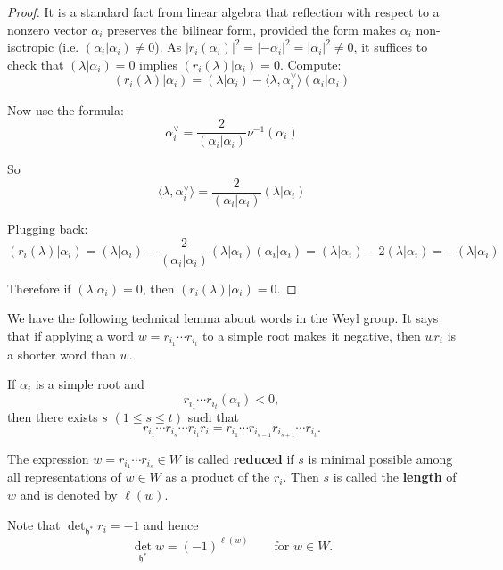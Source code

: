 \documentclass[12pt]{article}
\begin{document}
\begin{proof}
    It is a standard fact from linear algebra that reflection with respect to a nonzero vector $\alpha_i$ preserves the bilinear form, provided the form makes $\alpha_i$ non-isotropic (i.e. $(\alpha_i|\alpha_i)\neq 0$). As $|r_i(\alpha_i)|^2 = |-\alpha_i|^2 = |\alpha_i|^2 \neq 0$, it suffices to check that $(\lambda|\alpha_i) = 0$ implies 
$(r_i(\lambda)|\alpha_i) = 0$. Compute:
\[
(r_i(\lambda)|\alpha_i) = (\lambda|\alpha_i) - \langle \lambda, \alpha_i^\vee \rangle (\alpha_i|\alpha_i)
\]

Now use the formula:
\[
\alpha_i^\vee = \frac{2}{(\alpha_i|\alpha_i)}\nu^{-1}(\alpha_i)
\]

So
\[
\langle \lambda, \alpha_i^\vee \rangle = \frac{2}{(\alpha_i|\alpha_i)} (\lambda|\alpha_i)
\]

Plugging back:
\[
(r_i(\lambda)|\alpha_i)
= (\lambda|\alpha_i) - \frac{2}{(\alpha_i|\alpha_i)} (\lambda|\alpha_i)(\alpha_i|\alpha_i)
= (\lambda|\alpha_i) - 2(\lambda|\alpha_i)
= -(\lambda|\alpha_i)
\]

Therefore if $(\lambda|\alpha_i) = 0$, then $(r_i(\lambda)|\alpha_i)=0$. 
\end{proof}



We have the following technical lemma about words in the Weyl group. It says that if applying a word $w = r_{i_1}\cdots r_{i_t}$ to a simple root makes it negative, then $wr_i$ is a shorter word than $w$.

\begin{lemma}\label{lem:exchange}
If $\alpha_i$ is a simple root and 
\[
   r_{i_1}\cdots r_{i_t}(\alpha_i) < 0,
\]
then there exists $s$ $(1 \leq s \leq t)$ such that
\begin{equation}\label{eq:3.10.1}
   r_{i_1}\cdots r_{i_s}\cdots r_{i_t} r_i
   = r_{i_1}\cdots r_{i_{s-1}} r_{i_{s+1}} \cdots r_{i_t}.
\end{equation}
\end{lemma}

\begin{definition}
The expression $w = r_{i_1}\cdots r_{i_s} \in W$ is called \textbf{reduced} if $s$ is 
minimal possible among all representations of $w \in W$ as a product of the $r_i$. 
Then $s$ is called the \textbf{length} of $w$ and is denoted by $\ell(w)$. 
\end{definition}
Note that $\det_{\mathfrak{h}^*} r_i = -1$ and hence
\begin{equation}\label{eq:3.11.1}
   \det_{\mathfrak{h}^*} w = (-1)^{\ell(w)} \qquad \text{for } w \in W.
\end{equation}
\end{document}
